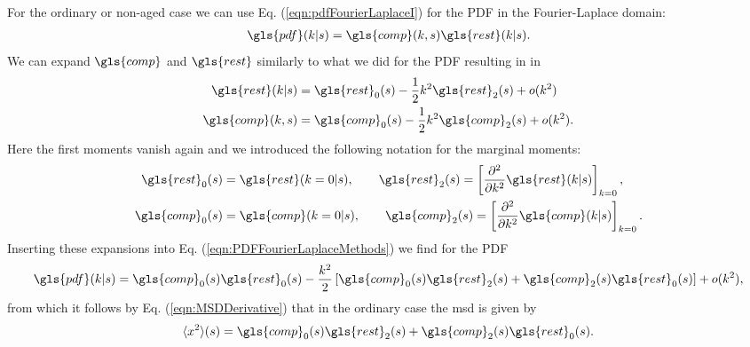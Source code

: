 For the ordinary or non-aged case we can use Eq. (\ref{eqn:pdfFourierLaplaceI}) for the \gls{PDF} in the Fourier-Laplace domain:
%
\begin{align}
\gls{pdf}(k|s) = \gls{comp}(k,s) \gls{rest}(k|s) \label{eqn:PDFFourierLaplaceMethods} .
\end{align}
%
We can expand $\gls{comp}$ and $\gls{rest}$ similarly to what we did for the \gls{PDF} resulting in in 
%
\begin{align}
\gls{rest}(k|s) &= \gls{rest}_0(s) - \frac{1}{2} k^2 \gls{rest}_2(s) + o(k^2) \label{eqn:rExpansion}\\
\gls{comp}(k,s) &= \gls{comp}_0(s)- \frac{1}{2} k^2 \gls{comp}_2(s) + o(k^2) .
\end{align}
%
Here the first moments vanish again and we introduced the following notation for the marginal moments:
%
\begin{align}
\gls{rest}_0(s) &=   \gls{rest}(k=0|s), \qquad \gls{rest}_2 (s) =   \left[ \npder{}{k}{2} \gls{rest}(k|s) \right]_{k=0}, \\
\gls{comp}_0(s) &=   \gls{comp}(k=0|s), \qquad \gls{comp}_2 (s) =   \left[ \npder{}{k}{2} \gls{comp}(k|s) \right]_{k=0}.
\end{align}
%
Inserting these expansions into Eq. (\ref{eqn:PDFFourierLaplaceMethods}) we find for the \gls{PDF}
%
\begin{align}
\gls{pdf}(k|s)  = \gls{comp}_0(s)\gls{rest}_0(s) - \frac{k^2}{2}\left[\gls{comp}_0(s) \gls{rest}_2(s)+\gls{comp}_2(s)\gls{rest}_0(s)\right] +o(k^2) ,
\end{align}
%
from which it follows by Eq. (\ref{eqn:MSDDerivative}) that in the ordinary case the \gls{msd} is given by 
%
\begin{align}
\mean{x^2}(s) = \gls{comp}_0(s) \gls{rest}_2(s)+\gls{comp}_2(s)\gls{rest}_0(s) \label{eqn:x2Ordinary}. 
\end{align}

